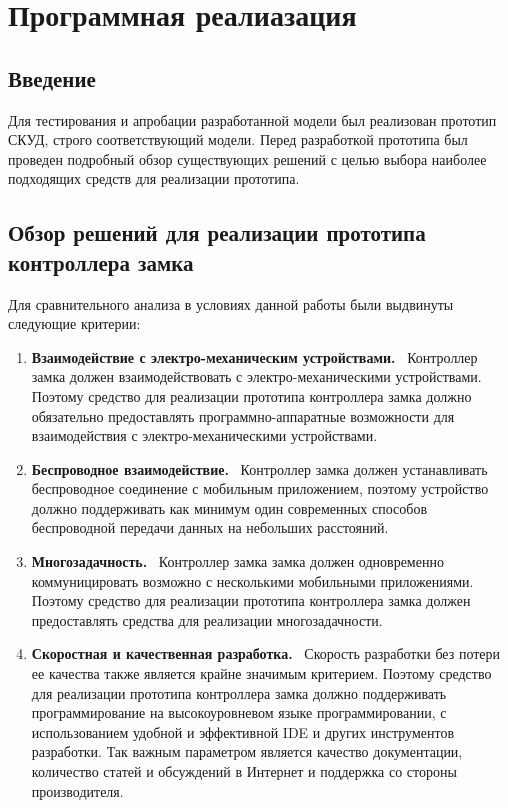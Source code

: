 \chapter{Программная реалиазация} \label{chapt3}

\section{Введение} \label{sect3_1}

Для тестирования и апробации разработанной модели был реализован прототип СКУД, строго соответствующий модели. Перед разработкой прототипа был проведен подробный обзор существующих решений с целью выбора наиболее подходящих средств для реализации прототипа.

\section{Обзор решений для реализации прототипа контроллера замка} \label{sect3_2}

Для сравнительного анализа в условиях данной работы были выдвинуты следующие критерии:
\begin{enumerate}
  \item \textbf{Взаимодействие с электро-механическим устройствами.}\hfill ~\linebreak
        Контроллер замка должен взаимодействовать с электро-механическими устройствами. Поэтому средство для реализации прототипа контроллера замка должно обязательно предоставлять программно-аппаратные возможности для взаимодействия с электро-механическими устройствами.

  \item \textbf{Беспроводное взаимодействие.}\hfill ~\linebreak
        Контроллер замка должен устанавливать беспроводное соединение с мобильным приложением, поэтому устройство должно поддерживать как минимум один современных способов беспроводной передачи данных на небольших расстояний.

  \item \textbf{Многозадачность.}\hfill ~\linebreak
        Контроллер замка замка должен одновременно коммуницировать возможно с несколькими мобильными приложениями. Поэтому средство для реализации прототипа контроллера замка должен предоставлять средства для реализации многозадачности.

  \item \textbf{Скоростная и качественная разработка.}\hfill ~\linebreak
        Скорость разработки без потери ее качества также является крайне значимым критерием. Поэтому средство для реализации прототипа контроллера замка должно поддерживать программирование на высокоуровневом языке программировании, с использованием удобной и эффективной IDE и других инструментов разработки. Так важным параметром является качество документации, количество статей и обсуждений в Интернет и поддержка со стороны производителя.
\end{enumerate} 

